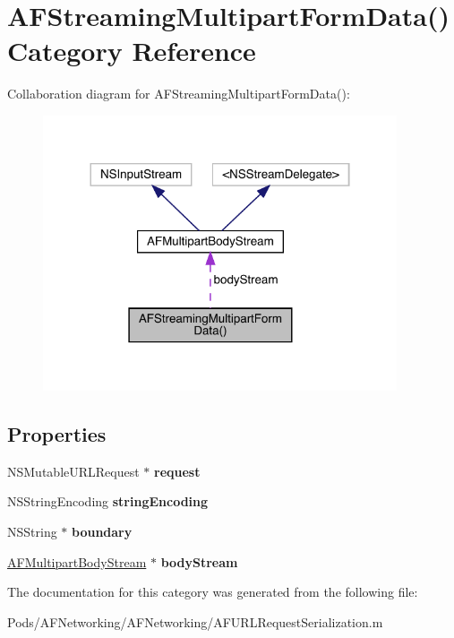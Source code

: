 \hypertarget{category_a_f_streaming_multipart_form_data_07_08}{}\section{A\+F\+Streaming\+Multipart\+Form\+Data() Category Reference}
\label{category_a_f_streaming_multipart_form_data_07_08}


Collaboration diagram for A\+F\+Streaming\+Multipart\+Form\+Data()\+:\nopagebreak
\begin{figure}[H]
\begin{center}
\leavevmode
\includegraphics[width=296pt]{category_a_f_streaming_multipart_form_data_07_08__coll__graph}
\end{center}
\end{figure}
\subsection*{Properties}
\begin{DoxyCompactItemize}
\item 
\mbox{\label{category_a_f_streaming_multipart_form_data_07_08_a2d0be87dd88432deeb33e4dfea850e48}} 
N\+S\+Mutable\+U\+R\+L\+Request $\ast$ {\bfseries request}
\item 
\mbox{\label{category_a_f_streaming_multipart_form_data_07_08_aad982e1c61bf6c3416c3e4596dfdf07b}} 
N\+S\+String\+Encoding {\bfseries string\+Encoding}
\item 
\mbox{\label{category_a_f_streaming_multipart_form_data_07_08_a4a37ad8cc6df9b5d14f0bf0c08e3f92e}} 
N\+S\+String $\ast$ {\bfseries boundary}
\item 
\mbox{\label{category_a_f_streaming_multipart_form_data_07_08_a41a2435c709facb4f2ae4e6ac644088e}} 
\mbox{\hyperlink{interface_a_f_multipart_body_stream}{A\+F\+Multipart\+Body\+Stream}} $\ast$ {\bfseries body\+Stream}
\end{DoxyCompactItemize}


The documentation for this category was generated from the following file\+:\begin{DoxyCompactItemize}
\item 
Pods/\+A\+F\+Networking/\+A\+F\+Networking/A\+F\+U\+R\+L\+Request\+Serialization.\+m\end{DoxyCompactItemize}
